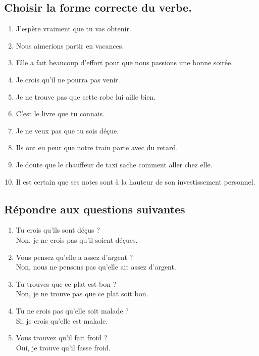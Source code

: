 \documentclass[12pt]{article}
\newcommand{\bleu}[1]{{\color{blue}#1}}
\begin{document}
\subsection{Choisir la forme correcte du verbe.}
\begin{enumerate}
	\item J’espère vraiment que tu \bleu{vas obtenir}.
	\item Nous aimerions \bleu{partir} en vacances.
	\item Elle a fait beaucoup d’effort pour que nous \bleu{passions} une bonne soirée.
	\item Je crois qu’il ne \bleu{pourra} pas venir.
	\item Je ne trouve pas que cette robe lui \bleu{aille} bien.
	\item C’est le livre que tu \bleu{connais}.
	\item Je ne veux pas que tu \bleu{sois} déçue.
	\item Ils ont eu peur que notre train \bleu{parte} avec du retard.
	\item Je doute que le chauffeur de taxi \bleu{sache} comment aller chez elle.
	\item Il est certain que ses notes \bleu{sont} à la hauteur de son investissement personnel.
\end{enumerate}
\subsection{Répondre aux questions suivantes}
\begin{enumerate}
	\item Tu crois qu’ils sont déçus ? \\
	       Non, je ne crois pas \bleu{qu'il soient déçues}.
	\item Vous pensez qu’elle a assez d’argent ? \\
	       Non, nous ne pensons pas \bleu{qu'elle ait assez d'argent}.
	\item Tu trouves que ce plat est bon ? \\
	       Non, je ne trouve pas \bleu{que ce plat soit bon}.
	\item Tu ne crois pas qu’elle soit malade ? \\
	       Si, je crois \bleu{qu'elle est malade}.
	\item Vous trouvez qu’il fait froid ? \\
	       Oui, je trouve \bleu{qu'il fasse froid}.
\end{enumerate}
\end{document}
